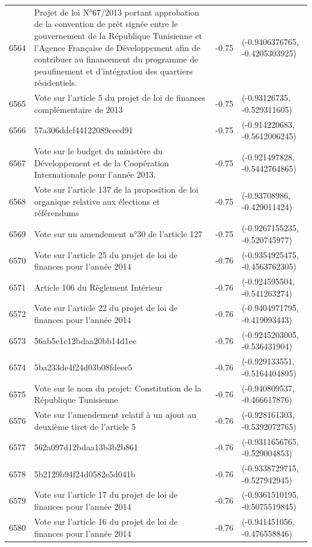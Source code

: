 \begin{table}[ht]
\begin{tabular}{rlrl}
  6564 & Projet de loi N°67/2013 portant approbation de la convention de prêt signée entre le gouvernement de la République Tunisienne et l'Agence Française de Développement afin de contribuer au financement du programme de peaufinement et d'intégration des quartiers résidentiels. & -0.75 & (-0.9406376765, -0.4205303925) \\ 
  6565 & Vote sur l'article 5 du projet de loi de finances complémentaire de 2013 & -0.75 & (-0.93126735, -0.529311605) \\ 
  6566 & 57a306ddcf44122089ceed91 & -0.75 & (-0.914220683, -0.5612006245) \\ 
  6567 & Vote sur le budget du ministère du Développement et de la Coopération Internationale pour l'année 2013. & -0.75 & (-0.921497828, -0.5442764865) \\ 
  6568 & Vote sur l'article 137 de la proposition de loi organique relative aux élections et référendums & -0.75 & (-0.93708986, -0.429011424) \\ 
  6569 & Vote sur un amendement n°30 de l'article 127 & -0.75 & (-0.9267155235, -0.520745977) \\ 
  6570 & Vote sur l'article 25 du projet de loi de finances pour l'année 2014 & -0.76 & (-0.9354925475, -0.4563762305) \\ 
  6571 & Article 106 du Règlement Intérieur & -0.76 & (-0.924595504, -0.541263274) \\ 
  6572 & Vote sur l'article 22 du projet de loi de finances pour l'année 2014 & -0.76 & (-0.9404971795, -0.419093443) \\ 
  6573 & 56ab5e1c12bdaa20bb14d1ee & -0.76 & (-0.9245203005, -0.536431904) \\ 
  6574 & 5ba233de4f24d03b08fdeec5 & -0.76 & (-0.929133551, -0.5164404895) \\ 
  6575 & Vote sur le nom du projet: Constitution de la République Tunisienne & -0.76 & (-0.940809537, -0.466617876) \\ 
  6576 & Vote sur l'amendement relatif à un ajout au deuxième tiret de l'article 5 & -0.76 & (-0.928161303, -0.5392072765) \\ 
  6577 & 562a097d12bdaa13b3b2b861 & -0.76 & (-0.9311656765, -0.529004853) \\ 
  6578 & 5b2129b94f24d0582e5d041b & -0.76 & (-0.9338729715, -0.527942945) \\ 
  6579 & Vote sur l'article 17 du projet de loi de finances pour l'année 2014 & -0.76 & (-0.9361510195, -0.5075519845) \\ 
  6580 & Vote sur l'article 16 du projet de loi de finances pour l'année 2014 & -0.76 & (-0.941451056, -0.476558846) \\ 

\end{tabular}
\end{table}

